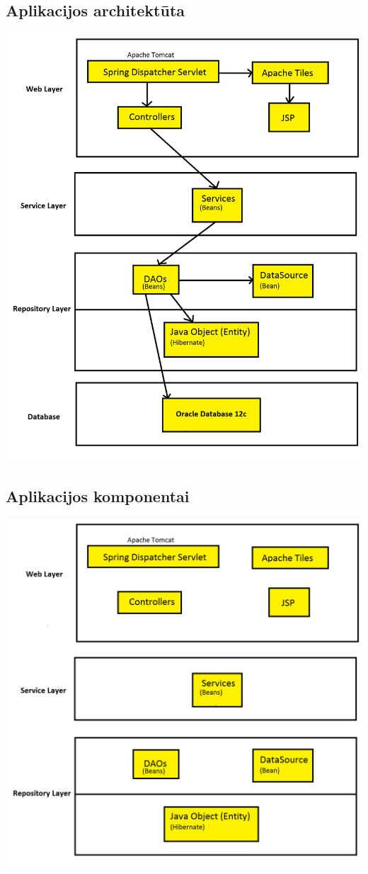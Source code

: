 \documentclass[a4paper,12pt]{article}
\begin{document}
\subsection{Aplikacijos architektūta}
\includegraphics[scale=0.5]{architektura2}
\subsection{Aplikacijos komponentai}
\includegraphics[scale=0.5]{architektura4}
\end{document}
